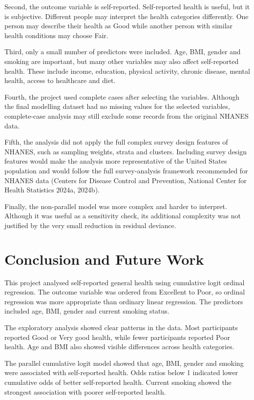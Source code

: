 \documentclass{article}
\begin{document}
Second, the outcome variable is self-reported. Self-reported health is
useful, but it is subjective. Different people may interpret the health
categories differently. One person may describe their health as Good
while another person with similar health conditions may choose Fair.

Third, only a small number of predictors were included. Age, BMI, gender
and smoking are important, but many other variables may also affect
self-reported health. These include income, education, physical
activity, chronic disease, mental health, access to healthcare and diet.

Fourth, the project used complete cases after selecting the variables.
Although the final modelling dataset had no missing values for the
selected variables, complete-case analysis may still exclude some
records from the original NHANES data.

Fifth, the analysis did not apply the full complex survey design
features of NHANES, such as sampling weights, strata and clusters.
Including survey design features would make the analysis more
representative of the United States population and would follow the full
survey-analysis framework recommended for NHANES data (Centers for
Disease Control and Prevention, National Center for Health Statistics
2024a, 2024b).

Finally, the non-parallel model was more complex and harder to
interpret. Although it was useful as a sensitivity check, its additional
complexity was not justified by the very small reduction in residual
deviance.

\section{Conclusion and Future Work}\label{conclusion-and-future-work}

This project analysed self-reported general health using cumulative
logit ordinal regression. The outcome variable was ordered from
Excellent to Poor, so ordinal regression was more appropriate than
ordinary linear regression. The predictors included age, BMI, gender and
current smoking status.

The exploratory analysis showed clear patterns in the data. Most
participants reported Good or Very good health, while fewer participants
reported Poor health. Age and BMI also showed visible differences across
health categories.

The parallel cumulative logit model showed that age, BMI, gender and
smoking were associated with self-reported health. Odds ratios below 1
indicated lower cumulative odds of better self-reported health. Current
smoking showed the strongest association with poorer self-reported
health.
\end{document}
